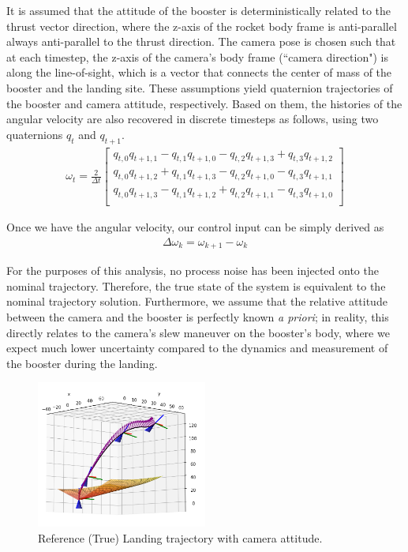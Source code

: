 \documentclass[conference]{IEEEtran}
\begin{document}
It is assumed that the attitude of the booster is deterministically related to the thrust vector direction, where the z-axis of the rocket body frame is anti-parallel always anti-parallel to the thrust direction. 
The camera pose is chosen such that at each timestep, the z-axis of the camera's body frame (``camera direction") is along the line-of-sight, which is a vector that connects the center of mass of the booster and the landing site.
These assumptions yield quaternion trajectories of the booster and camera attitude, respectively. 
Based on them, the histories of the angular velocity are also recovered in discrete timesteps as follows, using two quaternions $q_t$ and $q_{t+1}$.
%
\begin{align}
    \omega_t = \frac{2}{\Delta t}
    \begin{bmatrix}
        q_{t,0}q_{t+1,1} - q_{t,1}q_{t+1,0} - q_{t,2}q_{t+1,3} + q_{t,3}q_{t+1,2} \\
        q_{t,0}q_{t+1,2} + q_{t,1}q_{t+1,3} - q_{t,2}q_{t+1,0} - q_{t,3}q_{t+1,1} \\
        q_{t,0}q_{t+1,3} - q_{t,1}q_{t+1,2} + q_{t,2}q_{t+1,1} - q_{t,3}q_{t+1,0} \\
    \end{bmatrix}
\end{align}

Once we have the angular velocity, our control input can be simply derived as 
%
\begin{align}
    \Delta \omega_k = \omega_{k+1} - \omega_{k}
\end{align}

For the purposes of this analysis, no process noise has been injected onto the nominal trajectory. Therefore, the true state of the system is equivalent to the nominal trajectory solution.
Furthermore, we assume that the relative attitude between the camera and the booster is perfectly known \textit{a priori}; in reality, this directly relates to the camera's slew maneuver on the booster's body, where we expect much lower uncertainty compared to the dynamics and measurement of the booster during the landing. 

\begin{figure}[ht!]
    \centering
    \includegraphics[width=0.5\textwidth]{rocket_traj.png}
    \caption{Reference (True) Landing trajectory with camera attitude.}
    \label{fig:enter-label}
\end{figure}
\end{document}
